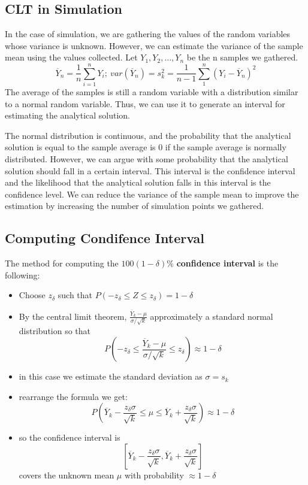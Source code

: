 \documentclass[11pt]{article}
\begin{document}
\subsection{CLT in Simulation}
In the case of simulation, we are gathering the values of the random variables whose variance is unknown.
However, we can estimate the variance of the sample mean using the values collected. 
Let $Y_1, Y_2, \ldots, Y_n$ be the n samples we gathered.
$$\overline{Y}_n = \frac{1}{n} \sum_{i=1}^{n}Y_i; \: var(\overline{Y}_n) = s_k^2 = \frac{1}{n-1} \sum_{1}^{n} (Y_i - \overline{Y}_n)^2 $$
The average of the samples is still a random variable with a distribution similar to a normal random variable. 
Thus, we can use it to generate an interval for estimating the analytical solution.

The normal distribution is continuous, and the probability that the analytical solution is equal to the sample average is 0 if the sample average is normally distributed.
However, we can argue with some probability that the analytical solution should fall in a certain interval. 
This interval is the confidence interval and the likelihood that the analytical solution falls in this interval is the confidence level.
We can reduce the variance of the sample mean to improve the estimation by increasing the number of simulation points we gathered. 

\subsection{Computing Condifence Interval}
The method for computing the $100(1-\delta)\% $ \textbf{confidence interval} is the following:
\begin{itemize}
  \item Choose $z_{\delta}$ such that $P(-z_{\delta} \leq Z \leq z_{\delta}) = 1 - \delta$
  \item By the central limit theorem, $\frac{\overline{Y}_k - \mu}{\sigma/\sqrt{k}} $ approximately a standard normal distribution so that 
  $$ P(-z_{\delta} \leq \frac{\overline{Y}_k - \mu}{\sigma/\sqrt{k}} \leq z_{\delta}) \approx 1 - \delta$$
  \item in this case we estimate the standard deviation as $\sigma = s_k$
  \item rearrange the formula we get:
  $$ P(\overline{Y}_k - \frac{ z_{\delta} \sigma}{ \sqrt{k} } \leq \mu \leq \overline{Y}_k + \frac{ z_{\delta} \sigma}{ \sqrt{k} } )  \approx 1 - \delta $$
  \item so the confidence interval is 
  $$[\overline{Y}_k - \frac{ z_{\delta} \sigma}{ \sqrt{k} } , \overline{Y}_k + \frac{ z_{\delta} \sigma}{ \sqrt{k} }  ]$$
  covers the unknown mean $\mu$ with probability $\approx 1 - \delta$
\end{itemize}
\end{document}
